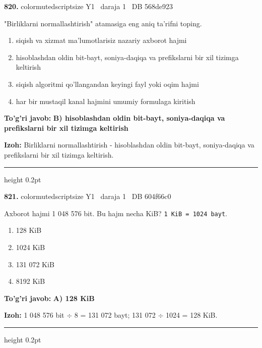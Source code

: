 \documentclass[10pt,a4paper,oneside]{article}
\begin{document}
\noindent\textbf{\color{ink}820.}  {color{muted}scriptsize Y1 \textbullet\ daraja 1 \textbullet\ DB 568de923}
\par
"Birliklarni normallashtirish" atamasiga eng aniq ta'rifni toping.
\begin{enumerate}[label=\Alph*),leftmargin=9mm]
\item siqish va xizmat ma'lumotlarisiz nazariy axborot hajmi
\item hisoblashdan oldin bit-bayt, soniya-daqiqa va prefikslarni bir xil tizimga keltirish
\item siqish algoritmi qo'llangandan keyingi fayl yoki oqim hajmi
\item har bir mustaqil kanal hajmini umumiy formulaga kiritish
\end{enumerate}
\begin{tcolorbox}[enhanced,breakable,colback=teal!4,colframe=teal!50!black,boxrule=0.5pt,arc=1.1mm,left=3mm,right=3mm,top=1.7mm,bottom=1.7mm,before skip=2mm,after skip=2mm]
\textbf{\color{teal}To'g'ri javob:} \textbf{B) hisoblashdan oldin bit-bayt, soniya-daqiqa va prefikslarni bir xil tizimga keltirish}
\par\smallskip
\textbf{Izoh:} Birliklarni normallashtirish - hisoblashdan oldin bit-bayt, soniya-daqiqa va prefikslarni bir xil tizimga keltirish.
\end{tcolorbox}
\vspace{2mm}\hrule height 0.2pt \vspace{3mm}

\noindent\textbf{\color{ink}821.}  {color{muted}scriptsize Y1 \textbullet\ daraja 1 \textbullet\ DB 604f66c0}
\par
Axborot hajmi 1 048 576 bit. Bu hajm necha KiB? \texttt{1 KiB = 1024 bayt}.
\begin{enumerate}[label=\Alph*),leftmargin=9mm]
\item 128 KiB
\item 1024 KiB
\item 131 072 KiB
\item 8192 KiB
\end{enumerate}
\begin{tcolorbox}[enhanced,breakable,colback=teal!4,colframe=teal!50!black,boxrule=0.5pt,arc=1.1mm,left=3mm,right=3mm,top=1.7mm,bottom=1.7mm,before skip=2mm,after skip=2mm]
\textbf{\color{teal}To'g'ri javob:} \textbf{A) 128 KiB}
\par\smallskip
\textbf{Izoh:} 1 048 576 bit \ensuremath{\div} 8 = 131 072 bayt; 131 072 \ensuremath{\div} 1024 = 128 KiB.
\end{tcolorbox}
\vspace{2mm}\hrule height 0.2pt \vspace{3mm}
\end{document}
